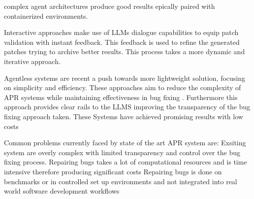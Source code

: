 complex agent architectures produce good results epically paired with containerized environments. \cite{puvvadiCodingAgentsComprehensive2025}

Interactive approaches make use of LLMs dialogue capabilities to equip patch validation with instant feedback. This feedback is used to refine the generated patches trying to archive better results. This process takes a more dynamic and iterative approach. \cite{xiaAutomatedProgramRepair2024}

Agentless systems are recent a push towards more lightweight solution, focusing on simplicity and efficiency. These approaches aim to reduce the complexity of APR systems while maintaining effectiveness in bug fixing \cite{xiaAgentlessDemystifyingLLMbased2024}. Furthermore this approach provides clear rails to the LLMS improving the transparency of the bug fixing approach taken.
These Systems have achieved promising results  with low costs \cite{xiaAgentlessDemystifyingLLMbased2024}


Common problems currently faced by state of the art APR system are:
Exsiting system are overly complex with limited transparency and control over the bug fixing process.\cite{xiaAgentlessDemystifyingLLMbased2024,puvvadiCodingAgentsComprehensive202, houLargeLanguageModels2024}
Repairing bugs takes a lot of computational resources and is time intensive therefore producing significant costs  \cite{sobaniaAnalysisAutomaticBug2023,puvvadiCodingAgentsComprehensive2025}
Repairing bugs is done on benchmarks or in controlled set up environments and not integrated into real world software development workflows \cite{meemExploringExperiencesAutomated2024,puvvadiCodingAgentsComprehensive2025}


